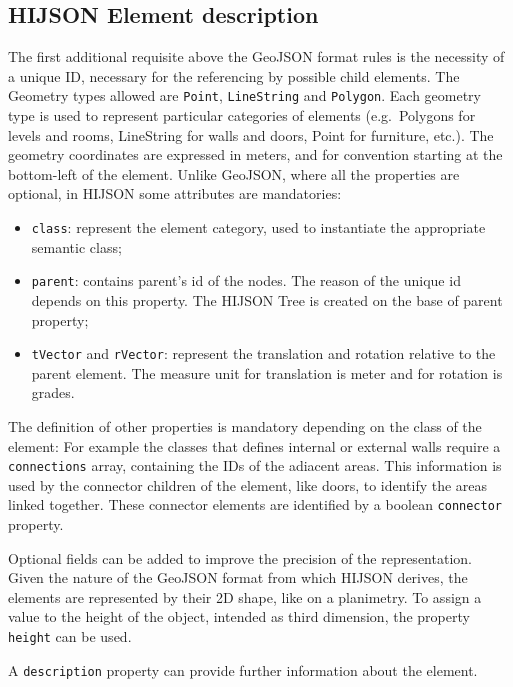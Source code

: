 \documentclass{sig-alternate}
\begin{document}
\subsection{HIJSON Element description}

The first additional requisite above the GeoJSON format rules is the
necessity of a unique ID, necessary for the referencing by possible
child elements. The Geometry types allowed are \texttt{Point},
\texttt{LineString} and \texttt{Polygon}. Each geometry type is used to
represent particular categories of elements (e.g.~Polygons for levels
and rooms, LineString for walls and doors, Point for furniture, etc.).
The geometry coordinates are expressed in meters, and for convention
starting at the bottom-left of the element. Unlike GeoJSON, where all
the properties are optional, in HIJSON some attributes are mandatories:

\begin{itemize}
\itemsep1pt\parskip0pt
\item
  \texttt{class}: represent the element category, used to instantiate
  the appropriate semantic class;
\item
  \texttt{parent}: contains parent's id of the nodes. The reason of the
  unique id depends on this property. The HIJSON Tree is created on the
  base of parent property;
\item
  \texttt{tVector} and \texttt{rVector}: represent the translation and
  rotation relative to the parent element. The measure unit for
  translation is meter and for rotation is grades.
\end{itemize}

The definition of other properties is mandatory depending on the class
of the element: For example the classes that defines internal or
external walls require a \texttt{connections} array, containing the IDs
of the adiacent areas. This information is used by the connector
children of the element, like doors, to identify the areas linked
together. These connector elements are identified by a
boolean \texttt{connector} property.

Optional fields can be added to improve the precision of the
representation. Given the nature of the GeoJSON format from which HIJSON
derives, the elements are represented by their 2D shape, like on a
planimetry. To assign a value to the height of the object, intended as
third dimension, the property \texttt{height} can be used.

A \texttt{description} property can provide further information about
the element.
\end{document}

